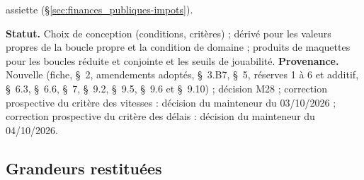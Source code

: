 \documentclass[11pt,a4paper]{article}
\begin{document}
\begin{proposee}
assiette (\S\ref{sec:finances_publiques-impots}).

\textbf{Statut.} Choix de conception (conditions, critères) ; dérivé pour les valeurs propres de la boucle propre et la condition de domaine ; produits de maquettes pour les boucles réduite et conjointe et les seuils de jouabilité. \textbf{Provenance.} Nouvelle (fiche, \S~2, amendements adoptés, \S~3.B7, \S~5, réserves 1 à 6 et additif, \S~6.3, \S~6.6, \S~7, \S~9.2, \S~9.5, \S~9.6 et \S~9.10) ; décision M28 ; correction prospective du critère des vitesses : décision du mainteneur du 03/10/2026 ; correction prospective du critère des délais : décision du mainteneur du 04/10/2026.
\end{proposee}

\subsection{Grandeurs restituées}
\label{sec:investissement-restitution}
\end{document}
